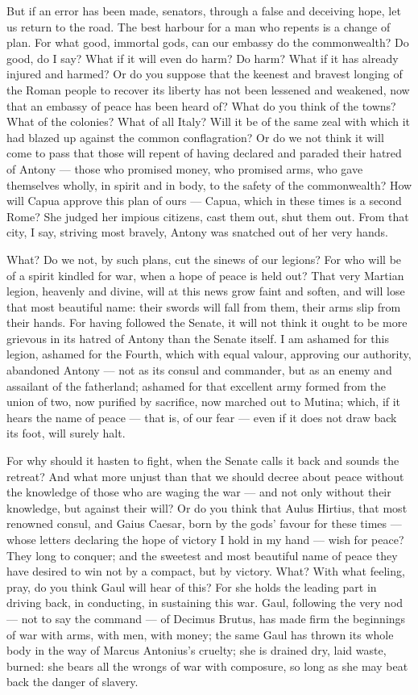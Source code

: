  But if an error has been made, senators, through a false and deceiving hope, let us return to the road. The best harbour for a man who repents is a change of plan. For what good, immortal gods, can our embassy do the commonwealth? Do good, do I say? What if it will even do harm? Do harm? What if it has already injured and harmed? Or do you suppose that the keenest and bravest longing of the Roman people to recover its liberty has not been lessened and weakened, now that an embassy of peace has been heard of? What do you think of the towns? What of the colonies? What of all Italy? Will it be of the same zeal with which it had blazed up against the common conflagration? Or do we not think it will come to pass that those will repent of having declared and paraded their hatred of Antony --- those who promised money, who promised arms, who gave themselves wholly, in spirit and in body, to the safety of the commonwealth? How will Capua approve this plan of ours --- Capua, which in these times is a second Rome? She judged her impious citizens, cast them out, shut them out. From that city, I say, striving most bravely, Antony was snatched out of her very hands.

 What? Do we not, by such plans, cut the sinews of our legions? For who will be of a spirit kindled for war, when a hope of peace is held out? That very Martian legion, heavenly and divine, will at this news grow faint and soften, and will lose that most beautiful name: their swords will fall from them, their arms slip from their hands. For having followed the Senate, it will not think it ought to be more grievous in its hatred of Antony than the Senate itself. I am ashamed for this legion, ashamed for the Fourth, which with equal valour, approving our authority, abandoned Antony --- not as its consul and commander, but as an enemy and assailant of the fatherland; ashamed for that excellent army formed from the union of two, now purified by sacrifice, now marched out to Mutina; which, if it hears the name of peace --- that is, of our fear --- even if it does not draw back its foot, will surely halt.

 For why should it hasten to fight, when the Senate calls it back and sounds the retreat? And what more unjust than that we should decree about peace without the knowledge of those who are waging the war --- and not only without their knowledge, but against their will? Or do you think that Aulus Hirtius, that most renowned consul, and Gaius Caesar, born by the gods' favour for these times --- whose letters declaring the hope of victory I hold in my hand --- wish for peace? They long to conquer; and the sweetest and most beautiful name of peace they have desired to win not by a compact, but by victory. What? With what feeling, pray, do you think Gaul will hear of this? For she holds the leading part in driving back, in conducting, in sustaining this war. Gaul, following the very nod --- not to say the command --- of Decimus Brutus, has made firm the beginnings of war with arms, with men, with money; the same Gaul has thrown its whole body in the way of Marcus Antonius's cruelty; she is drained dry, laid waste, burned: she bears all the wrongs of war with composure, so long as she may beat back the danger of slavery.

